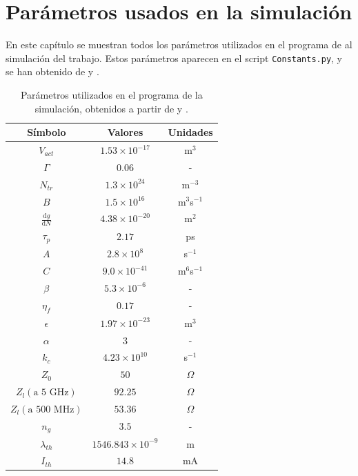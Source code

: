 \documentclass[a4paper, 11pt, oneside]{book}
\begin{document}
			\newpage
			\appendix


				\chapter{Par\'ametros usados en la simulación}
					\label{App:params}

					En este cap\'itulo se muestran todos los par\'ametros utilizados en el programa de al simulación del trabajo. Estos par\'ametros aparecen en el script \texttt{Constants.py}, y se han obtenido de \cite{artSim} y \cite{Chaves19}.

					\begin{table}[H]
						\centering
						\begin{tabular}{| c | c | c |}
							\hline
							S\'imbolo & Valores & Unidades \\ \hline
							$V_{act}$ & $1.53 \times 10^{-17}$ & m$^3$ \\\hline 
							$\Gamma$ & $0.06$ & - \\\hline 
							$N_{tr}$ & $1.3 \times 10^{24}$ & m$^{-3}$ \\\hline 
							$B$ & $1.5 \times 10^{16}$ & m$^3$s$^{-1}$ \\\hline 
							$\frac{\mathrm{d} g}{\mathrm{d}N}$ & $4.38 \times 10^{-20}$ & m$^2$ \\\hline 
							$\tau_p$ & $2.17$ & ps \\\hline 
							$A$ & $2.8 \times 10^8$ & s$^{-1}$ \\\hline 
							$C$ & $9.0 \times 10^{-41}$ & m$^6$s$^{-1}$ \\\hline 
							$\beta$ & $5.3 \times 10^{-6}$ & - \\\hline 
							$\eta_f$ & $0.17$ & - \\\hline 
							$\epsilon$ & $1.97 \times 10^{-23}$ & m$^3$ \\\hline 
							$\alpha$ & $3$ & - \\\hline 
							$k_c$ & $4.23 \times 10^{10}$ & s$^{-1}$ \\\hline 
							$Z_0$ & $50$ & $\Omega$ \\\hline 
							$Z_l (\textrm{a 5 GHz})$ & $92.25$ & $\Omega$ \\\hline 
							$Z_l (\textrm{a 500 MHz})$ & $53.36$ & $\Omega$ \\\hline 
							$n_g$ & $3.5$ & - \\\hline 
							$\lambda_{th}$ & $1546.843 \times 10^{-9}$ & m \\\hline 
							$I_{th}$ & $14.8$ & mA \\\hline 
						\end{tabular}
						\caption{\label{tab:param}Par\'ametros utilizados en el programa de la simulación, obtenidos a partir de \cite{artSim} y \cite{Chaves19}.}
					\end{table}
\end{document}
